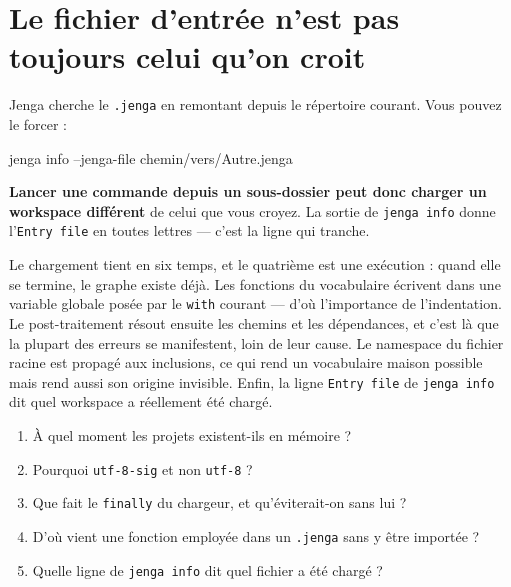 \section{Le fichier d'entrée n'est pas toujours celui qu'on croit}

\begin{nkretenir}
Jenga cherche le \texttt{.jenga} en remontant depuis le répertoire courant. Vous
pouvez le forcer :

\begin{nkcode}{}
jenga info --jenga-file chemin/vers/Autre.jenga
\end{nkcode}

\textbf{Lancer une commande depuis un sous-dossier peut donc charger un workspace
différent} de celui que vous croyez. La sortie de \texttt{jenga info} donne
l'\texttt{Entry file} en toutes lettres --- c'est la ligne qui tranche.
\end{nkretenir}

\begin{nkbilan}
Le chargement tient en six temps, et le quatrième est une exécution : quand elle
se termine, le graphe existe déjà. Les fonctions du vocabulaire écrivent dans une
variable globale posée par le \texttt{with} courant --- d'où l'importance de
l'indentation. Le post-traitement résout ensuite les chemins et les dépendances,
et c'est là que la plupart des erreurs se manifestent, loin de leur cause. Le
namespace du fichier racine est propagé aux inclusions, ce qui rend un
vocabulaire maison possible mais rend aussi son origine invisible. Enfin, la
ligne \texttt{Entry file} de \texttt{jenga info} dit quel workspace a réellement
été chargé.
\end{nkbilan}

\begin{nkquestions}
\begin{enumerate}
\item À quel moment les projets existent-ils en mémoire ?
\item Pourquoi \texttt{utf-8-sig} et non \texttt{utf-8} ?
\item Que fait le \texttt{finally} du chargeur, et qu'éviterait-on sans lui ?
\item D'où vient une fonction employée dans un \texttt{.jenga} sans y être
      importée ?
\item Quelle ligne de \texttt{jenga info} dit quel fichier a été chargé ?
\end{enumerate}
\end{nkquestions}

